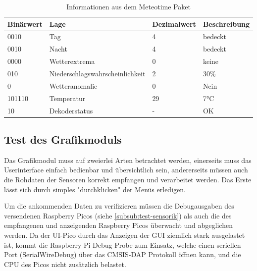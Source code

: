 \documentclass[a4paper,11pt]{article}
\begin{document}
\begin{table}[H]
  \centering
  \begin{tabular}{|l|l|l|l|}
  \hline
  \textbf{Binärwert} & \textbf{Lage}                   & \textbf{Dezimalwert} & \textbf{Beschreibung} \\ \hline
  0010               & Tag                             & 4                    & bedeckt               \\ \hline
  0010               & Nacht                           & 4                    & bedeckt               \\ \hline
  0000               & Wetterextrema                   & 0                    & keine                 \\ \hline
  010                & Niederschlagswahrscheinlichkeit & 2                    & 30\%                  \\ \hline
  0                  & Wetteranomalie                  & 0                    & Nein                  \\ \hline
  101110             & Temperatur                      & 29                   & 7°C                   \\ \hline
  10                 & Dekoderstatus                   & -                    & OK                    \\ \hline
  \end{tabular}
  \caption{Informationen aus dem Meteotime Paket}
  \label{tab:meteopacket}
  \end{table}

\subsection{Test des Grafikmoduls}
Das Grafikmodul muss auf zweierlei Arten betrachtet werden, einerseits muss das Userinterface einfach bedienbar und übersichtlich sein, andererseits müssen auch die Rohdaten der Sensoren korrekt empfangen und verarbeitet werden. Das Erste lässt sich durch simples "durchklicken" der Menüs erledigen.

\vspace{0.2cm}
\noindent
Um die ankommenden Daten zu verifizieren müssen die Debugausgaben des versendenen Raspberry Picos (siehe \ref{subsub:test-sensorik}) als auch die des empfangenen und anzeigenden Raspberry Picos überwacht und abgeglichen werden.
Da der UI-Pico durch das Anzeigen der GUI ziemlich stark ausgelastet ist, kommt die Raspberry Pi Debug Probe zum Einsatz, welche einen seriellen Port (SerialWireDebug) über das CMSIS-DAP Protokoll öffnen kann, und die CPU des Picos nicht zusätzlich belastet.
\end{document}
